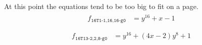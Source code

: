 \documentclass{dcthesis}
\numberwithin{equation}{section}
\theoremstyle{definition}
\theoremstyle{remark}
\begin{document}
{{{    At this point the equations tend to be
    too big to fit on a page.
    \begin{align}
      \label{eqn:d16t1_11616}
      \begin{split}
        f_{\texttt{16T1-1,16,16-g0}}
        &=y^{16} + x - 1\\
      \end{split}
    \end{align}
    \begin{align}
      \label{eqn:d16t13_228}
      \begin{split}
        f_{\texttt{16T13-2,2,8-g0}}
        &=y^{16} + (4x - 2)y^8 + 1\\
      \end{split}
    \end{align}
}}}
\end{document}
